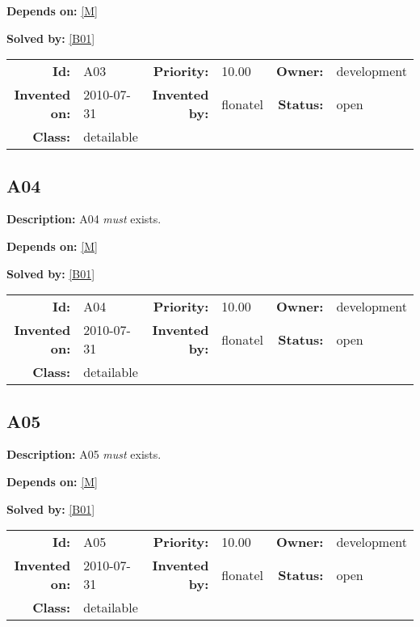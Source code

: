 \textbf{Depends on:} \ref{M} 

\textbf{Solved by:} \ref{B01} 

\par
{\small \begin{center}\begin{tabular}{rlrlrl}
\textbf{Id:} & A03  & \textbf{Priority:} & 10.00  & \textbf{Owner:} & development\\ 
\textbf{Invented on:} & 2010-07-31  & \textbf{Invented by:} & flonatel  & \textbf{Status:} & open \\ 
\textbf{Class:} & detailable  & & & \end{tabular}\end{center} }
\subsection{A04}\label{A04}
\textbf{Description:} A04 \textsl{must} exists.

\textbf{Depends on:} \ref{M} 

\textbf{Solved by:} \ref{B01} 

\par
{\small \begin{center}\begin{tabular}{rlrlrl}
\textbf{Id:} & A04  & \textbf{Priority:} & 10.00  & \textbf{Owner:} & development\\ 
\textbf{Invented on:} & 2010-07-31  & \textbf{Invented by:} & flonatel  & \textbf{Status:} & open \\ 
\textbf{Class:} & detailable  & & & \end{tabular}\end{center} }
\subsection{A05}\label{A05}
\textbf{Description:} A05 \textsl{must} exists.

\textbf{Depends on:} \ref{M} 

\textbf{Solved by:} \ref{B01} 

\par
{\small \begin{center}\begin{tabular}{rlrlrl}
\textbf{Id:} & A05  & \textbf{Priority:} & 10.00  & \textbf{Owner:} & development\\ 
\textbf{Invented on:} & 2010-07-31  & \textbf{Invented by:} & flonatel  & \textbf{Status:} & open \\ 
\textbf{Class:} & detailable  & & & \end{tabular}\end{center} }
